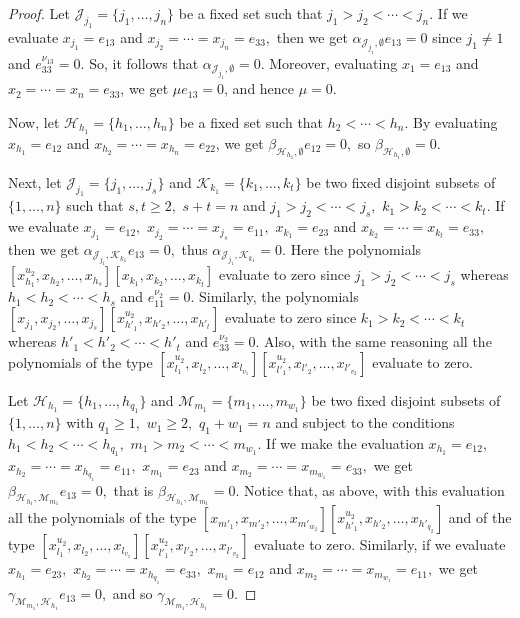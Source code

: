 \documentclass[a4paper,reqno]{amsart}
\theoremstyle{definition}
\numberwithin{equation}{section}
\numberwithin{theorem}{section}
\begin{document}
\begin{proof}
Let $\mathcal{J}_{j_1}=\{j_1,\ldots,j_n\}$ be a fixed set such that $j_1>j_2<  \cdots < j_n.$ If we evaluate $ x_{j_1}= e_{13}$ and  $x_{j_2}=\cdots = x_{j_n}= e_{33},$ then we get $\alpha_{ \mathcal{J}_{j_1}, \emptyset}  e_{13}=0$ since $j_1\neq 1$ and $e_{33}^{\nu_{13}}=0$. So, it follows that $ \alpha_{ \mathcal{J}_{j_1}, \emptyset}=0$.  
Moreover, evaluating $x_1=e_{13}$ and $x_2=\cdots=x_n=e_{33}$, we get $\mu  e_{13}=0$, and hence $\mu=0$.

Now, let $\mathcal{H}_{h_1}=\{h_1,\ldots,h_{n}\}$ be a fixed set such that $h_2< \cdots <h_n$. By evaluating $ x_{h_1}= e_{12}$ and  $x_{h_2}=\cdots = x_{h_n}= e_{22}$, we get $\beta_{ \mathcal{H}_{h_1}, \emptyset}  e_{12}=0,$ so  $\beta_{ \mathcal{H}_{h_1}, \emptyset}=0.$ 


Next, let $\mathcal{J}_{j_1}=\{j_1,\ldots,j_s\}$ and $\mathcal{K}_{k_1}=\{k_1,\ldots,k_t\}$ be two fixed disjoint subsets of $\{1,\ldots,n\}$ such that $s,t\geq 2,$ $s+t=n$ and $j_1>j_2<  \cdots < j_s,$ $k_1>k_2<  \cdots < k_t.$ If we evaluate
$ x_{j_1}= e_{12},$  $x_{j_2}=\cdots = x_{j_s}= e_{11},$ $ x_{k_1}= e_{23}$ and  $x_{k_2}=\cdots = x_{k_t}= e_{33},$ then we get $\alpha_{ \mathcal{J}_{j_1}, \mathcal{K}_{k_1}} e_{13}=0,$ thus $\alpha_{ \mathcal{J}_{j_1}, \mathcal{K}_{k_1}}=0.$
Here the polynomials  $[x_{h_1}^{u_{2}},x_{h_2},\dots,x_{h_{s}}][x_{k_1},x_{k_2},\dots,x_{k_{t}}]$  evaluate to zero since $j_1>j_2<  \cdots < j_s$ whereas $h_1<h_2<\cdots <h_{s}$ and $e_{11}^{\nu_{2}}=0.$ Similarly, the polynomials  $[x_{j_1},x_{j_2},\dots,x_{j_s}][x_{h'_1}^{u_{2}},x_{h'_2},\dots,x_{h'_{t}}]$ evaluate to zero since  $k_1>k_2<  \cdots < k_t$ whereas $h'_1<h'_2<\cdots <h'_t$ and $e_{33}^{\nu_{2}}=0.$
Also, with the same reasoning all the polynomials of the type $[x_{l_1}^{u_{2}},x_{l_2},\dots,x_{l_{v_1}}][x_{l'_1}^{u_{2}},x_{l'_2},\dots,x_{l'_{v_2}}]$ evaluate to zero.


Let $\mathcal{H}_{h_1}=\{h_1,\ldots,h_{q_1}\}$ and  $\mathcal{M}_{m_1}=\{m_1,\ldots,m_{w_1}\}$ be two fixed disjoint subsets of $\{1,\ldots,n\}$ with $q_1\geq 1,$ $w_1\geq 2,$ $q_1+w_1=n$ and subject to the conditions $h_1<h_2<  \cdots < h_{q_1},$ $m_1>m_2<  \cdots < m_{w_1}.$ If we make the evaluation $x_{h_1}=e_{12},$ $x_{h_2}=\cdots = x_{h_{q_1}}= e_{11},$ $x_{m_1}=e_{23}$ and $x_{m_2}= \cdots = x_{m_{w_1}}= e_{33},$ we get $\beta_{\mathcal{H}_{h_1}, \mathcal{M}_{m_1}}e_{13}=0,$ that is $\beta_{\mathcal{H}_{h_1}, \mathcal{M}_{m_1}}=0.$ Notice that, as above, with this evaluation all the polynomials of the type $[x_{m'_1},x_{m'_2},\dots,x_{m'_{w_2}}][x_{h'_1}^{u_{2}},x_{h'_2},\dots,x_{h'_{q_2}}]$ and of the type $[x_{l_1}^{u_{2}},x_{l_2},\dots,x_{l_{v_1}}][x_{l'_1}^{u_{2}},x_{l'_2},\dots,x_{l'_{v_2}}]$ evaluate to zero.
Similarly, if we evaluate $x_{h_1}=e_{23},$ $x_{h_2}=\cdots = x_{h_{q_1}}= e_{33},$ $x_{m_1}=e_{12}$ and $x_{m_2}= \cdots = x_{m_{w_1}}= e_{11},$ we get $\gamma_{\mathcal{M}_{m_1}, \mathcal{H}_{h_1}}e_{13}=0,$ and so $\gamma_{\mathcal{M}_{m_1}, \mathcal{H}_{h_1}}=0.$


\end{proof}
\end{document}
